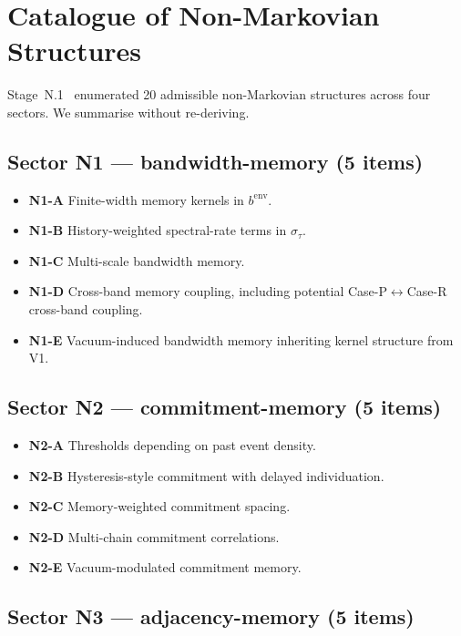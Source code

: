 \documentclass[11pt,a4paper]{article}
\begin{document}
\section{Catalogue of Non-Markovian Structures}

Stage~N.1~\cite{n1} enumerated 20 admissible non-Markovian structures across four sectors. We summarise without re-deriving.

\subsection{Sector N1 --- bandwidth-memory (5 items)}

\begin{itemize}
  \item \textbf{N1-A} Finite-width memory kernels in $b^\mathrm{env}$.
  \item \textbf{N1-B} History-weighted spectral-rate terms in $\sigma_\tau$.
  \item \textbf{N1-C} Multi-scale bandwidth memory.
  \item \textbf{N1-D} Cross-band memory coupling, including potential Case-P$\leftrightarrow$Case-R cross-band coupling.
  \item \textbf{N1-E} Vacuum-induced bandwidth memory inheriting kernel structure from V1.
\end{itemize}

\subsection{Sector N2 --- commitment-memory (5 items)}

\begin{itemize}
  \item \textbf{N2-A} Thresholds depending on past event density.
  \item \textbf{N2-B} Hysteresis-style commitment with delayed individuation.
  \item \textbf{N2-C} Memory-weighted commitment spacing.
  \item \textbf{N2-D} Multi-chain commitment correlations.
  \item \textbf{N2-E} Vacuum-modulated commitment memory.
\end{itemize}

\subsection{Sector N3 --- adjacency-memory (5 items)}
\end{document}
